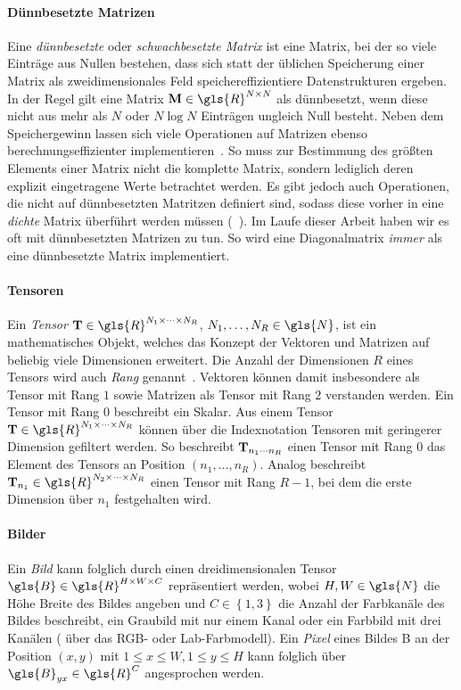 \paragraph{Dünnbesetzte Matrizen}

Eine \emph{dünnbesetzte} oder \emph{schwachbesetzte Matrix} ist eine Matrix, bei der so viele Einträge aus Nullen bestehen, dass sich statt der üblichen Speicherung einer Matrix als zweidimensionales Feld speichereffizientiere Datenstrukturen ergeben.
In der Regel gilt eine Matrix $\ma{M}\in \gls{R}^{N \times N}$ als dünnbesetzt, wenn diese nicht aus mehr als $N$ oder $N \log N$ Einträgen ungleich Null besteht.
Neben dem Speichergewinn lassen sich viele Operationen auf Matrizen ebenso berechnungseffizienter implementieren~\cite{Saad}.
So muss \zB{} zur Bestimmung des größten Elements einer Matrix nicht die komplette Matrix, sondern lediglich deren explizit eingetragene Werte betrachtet werden.
Es gibt jedoch auch Operationen, die nicht auf dünnbesetzten Matritzen definiert sind, sodass diese vorher in eine \emph{dichte} Matrix überführt werden müssen (\vgl{}~\cite{Saad}).
Im Laufe dieser Arbeit haben wir es oft mit dünnbesetzten Matrizen zu tun.
So wird \zB{} eine Diagonalmatrix \emph{immer} als eine dünnbesetzte Matrix implementiert.

\paragraph{Tensoren}

Ein \emph{Tensor} $\ma{T} \in \gls{R}^{N_1 \times \cdots \times N_R}$, $N_1, \ldots, N_R \in \gls{N}$, ist ein mathematisches Objekt, welches das Konzept der Vektoren und Matrizen auf beliebig viele Dimensionen erweitert.
Die Anzahl der Dimensionen $R$ eines Tensors wird auch \emph{Rang} genannt~\cite{linear}.
Vektoren können damit insbesondere als Tensor mit Rang $1$ sowie Matrizen als Tensor mit Rang $2$ verstanden werden.
Ein Tensor mit Rang $0$ beschreibt ein Skalar.
Aus einem Tensor $\ma{T} \in \gls{R}^{N_1 \times \cdots \times N_R}$ können über die Indexnotation Tensoren mit geringerer Dimension gefiltert werden.
So beschreibt $\mathbf{T}_{n_1 \cdots n_R}$ einen Tensor mit Rang $0$ \bzw{} das Element des Tensors an Position $\left(n_1, \ldots, n_R\right)$.
Analog beschreibt \zB{} $\ma{T}_{n_1} \in \gls{R}^{N_2 \times \cdots \times N_R}$ einen Tensor mit Rang $R-1$, bei dem die erste Dimension über $n_1$ festgehalten wird.

\paragraph{Bilder}

Ein \emph{Bild} kann folglich durch einen dreidimensionalen Tensor $\gls{B} \in \gls{R}^{H \times W \times C}$ repräsentiert werden, wobei $H, W \in \gls{N}$ die Höhe \bzw{} Breite des Bildes angeben und $C \in \left\{1, 3\right\}$ die Anzahl der Farbkanäle des Bildes beschreibt, \dhe{} ein Graubild mit nur einem Kanal oder ein Farbbild mit drei Kanälen (\zB{} über das RGB- oder Lab-Farbmodell).
Ein \emph{Pixel} eines Bildes \gls{B} an der Position $\left(x, y\right)$ mit $1 \leq x \leq W, 1 \leq y \leq H$ kann folglich über $\gls{B}_{yx} \in \gls{R}^C$ angesprochen werden.
